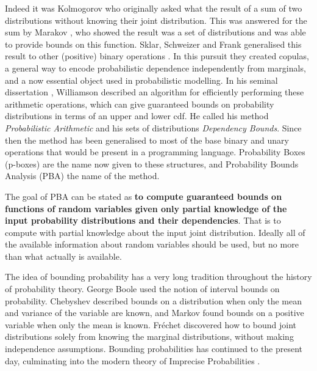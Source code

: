 \documentclass{juliacon}
\begin{document}
\noindent Indeed it was Kolmogorov who originally asked what the result of a sum of two distributions without knowing their joint distribution. This was answered for the sum by Marakov \cite{makarov1982estimates}, who showed the result was a set of distributions and was able to provide bounds on this function. Sklar, Schweizer and Frank generalised this result to other (positive) binary operations \cite{frank1987best,schweizer2011probabilistic}. In this pursuit they created copulas, a general way to encode probabilistic dependence independently from marginals, and a now essential object used in probabilistic modelling. In his seminal dissertation \cite{williamson1989probabilistic}, Williamson described an algorithm for efficiently performing these arithmetic operations, which can give guaranteed bounds on probability distributions in terms of an upper and lower cdf. He called his method \textit{Probabilistic Arithmetic} and his sets of distributions \textit{Dependency Bounds}. Since then the method has been generalised \cite{ferson2015constructing,ferson1996whereof,ferson2004arithmetic} to most of the base binary and unary operations that would be present in a programming language. Probability Boxes (p-boxes) are the name now given to these structures, and Probability Bounds Analysis (PBA) the name of the method.

The goal of PBA can be stated as \textbf{to compute guaranteed bounds on functions of random variables given only partial knowledge of the input probability distributions and their dependencies}. That is to compute with partial knowledge about the input joint distribution. Ideally all of the available information about random variables should be used, but no more than what actually is available.

The idea of bounding probability has a very long tradition throughout the history of probability theory. George Boole \cite{boole1854investigation, hailperin1986boole} used the notion of interval bounds on probability. Chebyshev \cite{chebyshev1874valeurs} described bounds on a distribution when only the mean and variance of the variable are known, and Markov \cite{markoff1900question} found bounds on a positive variable when only the mean is known.  Fréchet \cite{frechet1935generalisation} discovered how to bound joint distributions solely from knowing the marginal distributions, without making independence assumptions. Bounding probabilities has continued to the present day, culminating into the modern theory of Imprecise Probabilities \cite{walley1991statistical, klir2013uncertainty, troffaes2014lower, augustin2014introduction}.
\end{document}

